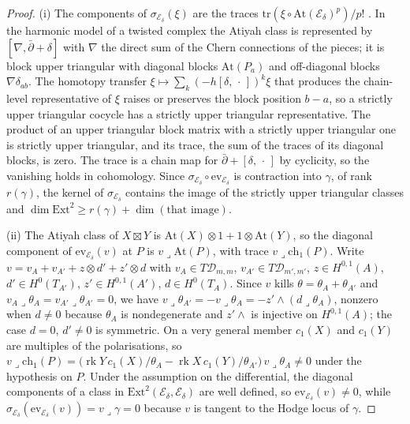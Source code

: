 \documentclass[11pt,reqno]{amsart}
\numberwithin{equation}{section}
\theoremstyle{plain}
\theoremstyle{definition}
\newcommand{\Ext}{\mathrm{Ext}}
\newcommand{\ch}{\mathrm{ch}}
\newcommand{\cD}{\mathcal{D}}
\begin{document}
\begin{proof}
(i) The components of $\sigma_{\mathcal{E}_{\delta}}(\xi)$ are the traces $\mathrm{tr}(\xi\circ\mathrm{At}(\mathcal{E}_{\delta})^{p})/p!$ \cite[Sect.~4]{BF03}. In the harmonic model of a twisted complex the Atiyah class is represented by $[\nabla,\bar\partial+\delta]$ with $\nabla$ the direct sum of the Chern connections of the pieces; it is block upper triangular with diagonal blocks $\mathrm{At}(P_{a})$ and off-diagonal blocks $\nabla\delta_{ab}$. The homotopy transfer $\xi\mapsto\sum_{k}(-h[\delta,\,\cdot\,])^{k}\xi$ that produces the chain-level representative of $\xi$ raises or preserves the block position $b-a$, so a strictly upper triangular cocycle has a strictly upper triangular representative. The product of an upper triangular block matrix with a strictly upper triangular one is strictly upper triangular, and its trace, the sum of the traces of its diagonal blocks, is zero. The trace is a chain map for $\bar\partial+[\delta,\,\cdot\,]$ by cyclicity, so the vanishing holds in cohomology. Since $\sigma_{\mathcal{E}_{\delta}}\circ\mathrm{ev}_{\mathcal{E}_{\delta}}$ is contraction into $\gamma$, of rank $r(\gamma)$, the kernel of $\sigma_{\mathcal{E}_{\delta}}$ contains the image of the strictly upper triangular classes and $\dim\Ext^{2}\ge r(\gamma)+\dim(\text{that image})$.

(ii) The Atiyah class of $X\boxtimes Y$ is $\mathrm{At}(X)\otimes1+1\otimes\mathrm{At}(Y)$, so the diagonal component of $\mathrm{ev}_{\mathcal{E}_{\delta}}(v)$ at $P$ is $v\lrcorner\mathrm{At}(P)$, with trace $v\lrcorner\ch_{1}(P)$. Write $v=v_{A}+v_{A'}+z\otimes d'+z'\otimes d$ with $v_{A}\in T\cD_{m,m}$, $v_{A'}\in T\cD_{m',m'}$, $z\in H^{0,1}(A)$, $d'\in H^{0}(T_{A'})$, $z'\in H^{0,1}(A')$, $d\in H^{0}(T_{A})$. Since $v$ kills $\theta=\theta_{A}+\theta_{A'}$ and $v_{A}\lrcorner\theta_{A}=v_{A'}\lrcorner\theta_{A'}=0$, we have $v\lrcorner\theta_{A'}=-v\lrcorner\theta_{A}=-z'\wedge(d\lrcorner\theta_{A})$, nonzero when $d\ne0$ because $\theta_{A}$ is nondegenerate and $z'\wedge$ is injective on $H^{0,1}(A)$; the case $d=0$, $d'\ne0$ is symmetric. On a very general member $c_{1}(X)$ and $c_{1}(Y)$ are multiples of the polarisations, so $v\lrcorner\ch_{1}(P)=\bigl(\operatorname{rk}Y\,c_{1}(X)/\theta_{A}-\operatorname{rk}X\,c_{1}(Y)/\theta_{A'}\bigr)\,v\lrcorner\theta_{A}\ne0$ under the hypothesis on $P$. Under the assumption on the differential, the diagonal components of a class in $\Ext^{2}(\mathcal{E}_{\delta},\mathcal{E}_{\delta})$ are well defined, so $\mathrm{ev}_{\mathcal{E}_{\delta}}(v)\ne0$, while $\sigma_{\mathcal{E}_{\delta}}(\mathrm{ev}_{\mathcal{E}_{\delta}}(v))=v\lrcorner\gamma=0$ because $v$ is tangent to the Hodge locus of $\gamma$.


\end{proof}
\end{document}
